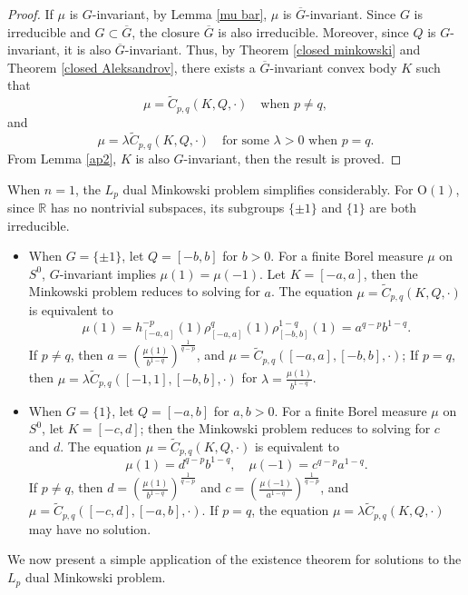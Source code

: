 \documentclass[12pt, reqno]{amsart}
\theoremstyle{definition}
\theoremstyle{remark}
\numberwithin{equation}{section}
\newcommand{\R}{\mathbb{R}}
\newcommand{\Lp}{L_{p}}
\begin{document}
			\begin{proof}
				If $\mu$ is $G$-invariant, by Lemma \ref{mu bar},  $\mu$ is $\overline{G}$-invariant. Since $G$ is irreducible and $G\subset \overline{G}$, the closure $\overline{G}$ is also irreducible. Moreover, since $Q$ is $G$-invariant, it is also $\overline{G}$-invariant. Thus, by Theorem \ref{closed minkowski} and Theorem \ref{closed Aleksandrov}, there exists a $\overline{G}$-invariant convex body $K$ such that
					\[
				\mu = \widetilde{C}_{p,q}(K, Q, \cdot) \quad \text{when $p \neq q$},
				\]
				and
				\[
				\mu = \lambda \widetilde{C}_{p,q}(K, Q, \cdot) \quad \text{for some $\lambda>0$ when $p=q$}.
				\]
				From Lemma \ref{ap2}, $K$ is also $G$-invariant, then the result is proved.
			\end{proof}
			
	When $n=1$, the $L_p$ dual Minkowski problem simplifies considerably. For $\mathrm{O}(1)$, since $\R$ has no nontrivial subspaces, its subgroups $\{\pm 1\}$ and $\{1\}$ are both irreducible. 
	\begin{itemize}
	\item	When $G=\{\pm 1\}$, let $Q=[-b, b]$ for $b>0$.
	For a  finite Borel measure $\mu$ on $S^{0}$, $G$-invariant implies $\mu(1)=\mu(-1)$. Let $K = [-a, a]$, then the Minkowski problem reduces to solving for  $a$. The equation $\mu = \widetilde{C}_{p,q}(K, Q, \cdot)$ is equivalent to
	$$\mu (1)=h_{[-a, a]}^{-p}(1)\rho_{[-a, a]}^{q}(1)\rho_{[-b, b]}^{1-q}(1)=a^{q-p}b^{1-q}.$$
	If $p\neq q$, then $a=(\frac{\mu(1)}{b^{1-q}})^{\frac{1}{q-p}}$, and $\mu = \widetilde{C}_{p,q}([-a,a], [-b, b], \cdot)$;
	If $p=q$, then $\mu = \lambda \widetilde{C}_{p,q}([-1,1], [-b, b], \cdot)$ for $\lambda=\frac{\mu(1)}{b^{1-q}}$.
	
	\item When $G=\{ 1\}$, let $Q=[-a, b]$ for $a, b>0$.
	For a  finite Borel measure $\mu$ on $S^{0}$, let $K = [-c, d]$; then the Minkowski problem reduces to solving for  $c$ and $d$. The equation $\mu = \widetilde{C}_{p,q}(K, Q, \cdot)$ is equivalent to
	$$\mu (1)=d^{q-p}b^{1-q}, \quad \mu (-1)=c^{q-p}a^{1-q}. $$
	If $p\neq q$, then $d=(\frac{\mu(1)}{b^{1-q}})^{\frac{1}{q-p}}$ and $c=(\frac{\mu(-1)}{a^{1-q}})^{\frac{1}{q-p}}$, and $\mu = \widetilde{C}_{p,q}([-c,d], [-a, b], \cdot)$.
	If $p=q$, the equation $\mu = \lambda \widetilde{C}_{p,q}(K, Q, \cdot)$
	 may have no solution.
	\end{itemize}
	
We now present a simple application of the existence theorem for solutions to the $\Lp$ dual Minkowski problem.
\end{document}

